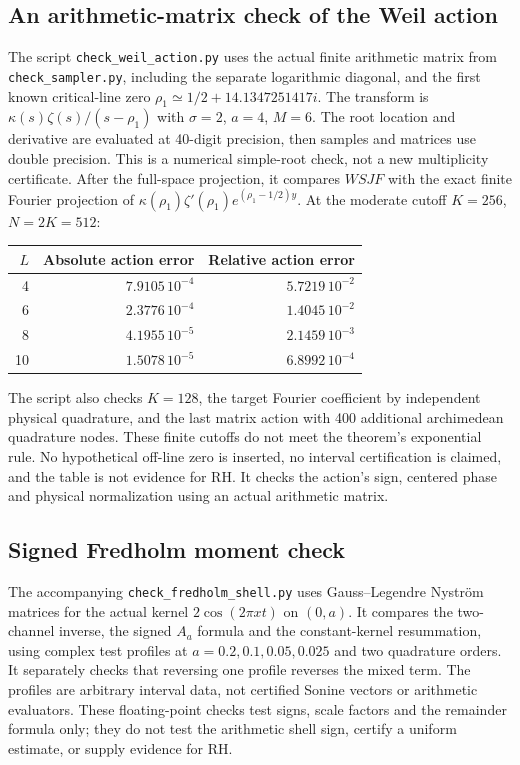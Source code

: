 \documentclass[11pt]{article}
\theoremstyle{remark}
\begin{document}
\subsection*{An arithmetic-matrix check of the Weil action}
The script \texttt{check\_weil\_action.py} uses the actual finite
arithmetic matrix from \texttt{check\_sampler.py}, including the
separate logarithmic diagonal, and the first known critical-line zero
$\rho_1\simeq1/2+14.1347251417i$. The transform is
$\kappa(s)\zeta(s)/(s-\rho_1)$ with $\sigma=2$, $a=4$, $M=6$.
The root location and derivative are evaluated at 40-digit precision,
then samples and matrices use double precision. This is a numerical
simple-root check, not a new multiplicity certificate. After the
full-space projection, it compares $WSJF$ with the exact finite
Fourier projection of
$\kappa(\rho_1)\zeta'(\rho_1)e^{(\rho_1-1/2)y}$.
At the moderate cutoff $K=256$, $N=2K=512$:
\begin{center}
\begin{tabular}{rrr}
\toprule
$L$ & Absolute action error & Relative action error\\
\midrule
4 & $7.9105\,10^{-4}$ & $5.7219\,10^{-2}$\\
6 & $2.3776\,10^{-4}$ & $1.4045\,10^{-2}$\\
8 & $4.1955\,10^{-5}$ & $2.1459\,10^{-3}$\\
10 & $1.5078\,10^{-5}$ & $6.8992\,10^{-4}$\\
\bottomrule
\end{tabular}
\end{center}
The script also checks $K=128$, the target Fourier coefficient by
independent physical quadrature, and the last matrix action with 400
additional archimedean quadrature nodes. These finite cutoffs do not
meet the theorem's exponential rule. No hypothetical off-line zero
is inserted, no interval certification is claimed, and the table is
not evidence for RH. It checks the action's sign, centered phase and
physical normalization using an actual arithmetic matrix.

\subsection*{Signed Fredholm moment check}
The accompanying \texttt{check\_fredholm\_shell.py} uses Gauss--Legendre
Nystr\"om matrices for the actual kernel $2\cos(2\pi xt)$ on $(0,a)$.
It compares the two-channel inverse, the signed $A_a$ formula and the
constant-kernel resummation, using complex test profiles at
$a=0.2,0.1,0.05,0.025$ and two quadrature orders. It separately checks
that reversing one profile reverses the mixed term. The profiles are
arbitrary interval data, not certified Sonine vectors or arithmetic
evaluators. These floating-point checks test signs, scale factors and
the remainder formula only; they do not test the arithmetic shell sign,
certify a uniform estimate, or supply evidence for RH.
\end{document}
